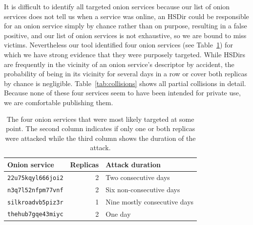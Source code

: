 It is difficult to identify all targeted onion services because \first our list
of onion services does not tell us when a service was online, \second an HSDir
could be responsible for an onion service simply by chance rather than on
purpose, resulting in a false positive, and \third our list of onion services is
not exhaustive, so we are bound to miss victims.  Nevertheless our tool
identified four onion services (see Table~\ref{tab:targeted}) for which we have
strong evidence that they were purposely targeted.  While HSDirs are frequently
in the vicinity of an onion service's descriptor by accident, the probability of
being in its vicinity for several days in a row or cover both replicas by chance
is negligible.  Table~\ref{tab:collisions} shows all partial collisions in
detail.  Because none of these four services seem to have been intended for
private use, we are comfortable publishing them.

\begin{table}[t]
	\centering
	\begin{tabular}{l r l}
	\toprule
	Onion service & Replicas & Attack duration \\
	\midrule
	\texttt{22u75kqyl666joi2} & 2 & Two consecutive days \\
	\texttt{n3q7l52nfpm77vnf} & 2 & Six non-consecutive days \\
	\texttt{silkroadvb5piz3r} & 1 & Nine mostly consecutive days \\
	\texttt{thehub7gqe43miyc} & 2 & One day \\
	\bottomrule
	\end{tabular}

	\caption{The four onion services that were most likely targeted at some
	point.  The second column indicates if only one or both replicas were
	attacked while the third column shows the duration of the attack.}
	\label{tab:targeted}
\end{table}

